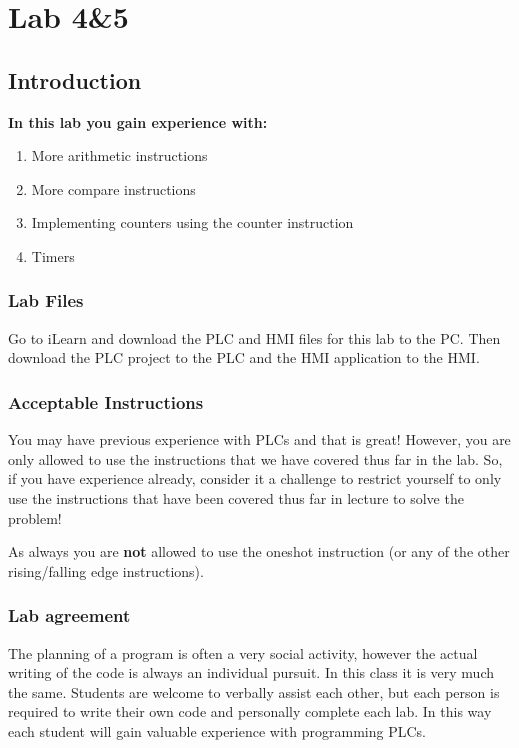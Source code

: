 \chapter{Lab 4\&5}
\setcounter{TASignatures}{0}
\setcounter{AsideCounter}{0}

\section{Introduction}
    \vspace{0.1em}

    \textbf{In this lab you gain experience with:}
    \begin{enumerate}
        \item More arithmetic instructions
        \item More compare instructions
        \item Implementing counters using the counter instruction
        \item Timers
    \end{enumerate}

\subsection{Lab Files}

Go to iLearn and download the PLC and HMI files for this lab to the PC. Then download the PLC project to the PLC and the HMI application to the HMI. 

\subsection{Acceptable Instructions}

You may have previous experience with PLCs and that is great! However, you are only allowed to use the instructions that we have covered thus far in the lab. So, if you have experience already, consider it a challenge to restrict yourself to only use the instructions that have been covered thus far in lecture to solve the problem!

As always you are \textbf{not} allowed to use the oneshot instruction (or any of the other rising/falling edge instructions).

\subsection{Lab agreement}

The planning of a program is often a very social activity, however the actual writing of the code is always an individual pursuit. In this class it is very much the same. Students are welcome to verbally assist each other, but each person is required to write their own code and personally complete each lab. In this way each student will gain valuable experience with programming PLCs. 

